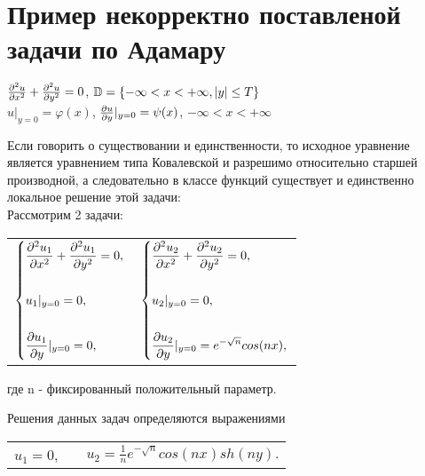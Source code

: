 \documentclass[../main.tex]{subfiles}
\begin{document}
\section{Пример некорректно поставленой задачи по Адамару}
\begin{large}
	\begin{center}
		$\frac{\partial^2 u}{\partial x^2}+\frac{\partial^2 u}{\partial y^2}=0$, $\mathbb{D}=\{ -\infty<x<+\infty, |y|\leq T\rbrace$\\
		$ $\\
		$ u|_{y=0} = \varphi(x)$, $\frac{\partial u}{\partial y}|_{y=0} = \psi(x)$, $ -\infty<x<+\infty$\\
		$ $\\
	\end{center}
\end{large}

Если говорить о существовании и единственности, то исходное уравнение является уравнением типа Ковалевской и разрешимо относительно старшей производной, а следовательно в классе функций существует и единственно локальное решение этой задачи:\\

Рассмотрим 2 задачи:\\

\begin{center}

	\begin{tabular}{c c}

		$
			\begin{dcases}
				\frac{\partial^2 u_1}{\partial x^2}+\frac{\partial^2 u_1}{\partial y^2}=0, \\\\
				u_1|_{y=0}=0,                        \\\\
				\frac{\partial u_1}{\partial y}|_{y=0}=0,
			\end{dcases} $
		 &
		$\begin{dcases}
				 \frac{\partial^2 u_2}{\partial x^2}+\frac{\partial^2 u_2}{\partial y^2}=0, \\\\
				 u_2|_{y=0}=0,                        \\\\
				 \frac{\partial u_2}{\partial y}|_{y=0}=e^{-\sqrt{n}}cos(nx),
			 \end{dcases} $
	\end{tabular}

\end{center}
где n - фиксированный положительный параметр.

Решения данных задач определяются выражениями

\begin{center}
	\begin{tabular}{c c c}
		$u_1=0$, &  & $u_2=\frac{1}{n}e^{-\sqrt{n}}cos(nx)sh(ny).$
	\end{tabular}
\end{center}
\end{document}
